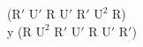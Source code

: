 ($\text{R}'$ $\text{U}'$ R $\text{U}'$ $\text{R}'$ $\text{U}^2$ R)\\
y (R $\text{U}^2$ $\text{R}'$ $\text{U}'$ R $\text{U}'$ $\text{R}'$)\\

